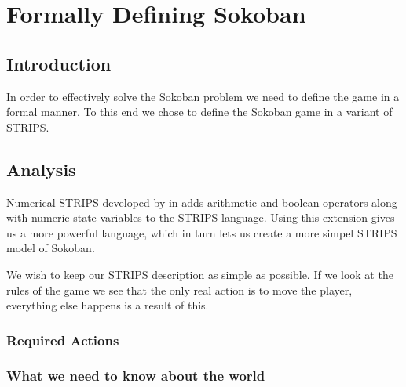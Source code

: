 \chapter{Formally Defining Sokoban}

\section{Introduction}
In order to effectively solve the Sokoban problem we need to define
the game in a formal manner. To this end we chose to define the
Sokoban game in a variant of STRIPS.



\section{Analysis}
Numerical STRIPS developed by \citet{Hoffmann03themetric-ff} in
\citeyear{Hoffmann03themetric-ff} adds arithmetic and boolean
operators along with numeric state variables to the STRIPS
language. Using this extension gives us a more powerful language,
which in turn lets us create a more simpel STRIPS model of Sokoban.

We wish to keep our STRIPS description as simple as possible. If we
look at the rules of the game we see that the only real action is to
move the player, everything else happens is a result of this.

\subsection{Required Actions}







\subsection{What we need to know about the world}



